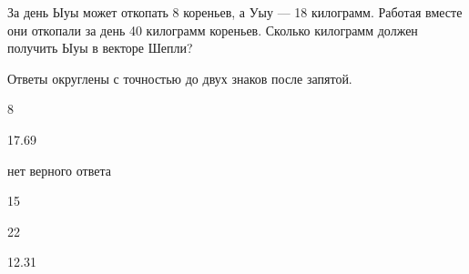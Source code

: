 
\begin{question}
За день Ыуы может откопать 8 кореньев, а Уыу --- 18 килограмм. Работая
вместе они откопали за день 40 килограмм кореньев. Сколько килограмм
должен получить Ыуы в векторе Шепли?

Ответы округлены с точностью до двух знаков после запятой.
\begin{answerlist}
  \item 8
  \item 17.69
  \item нет верного ответа
  \item 15
  \item 22
  \item 12.31
\end{answerlist}
\end{question}


